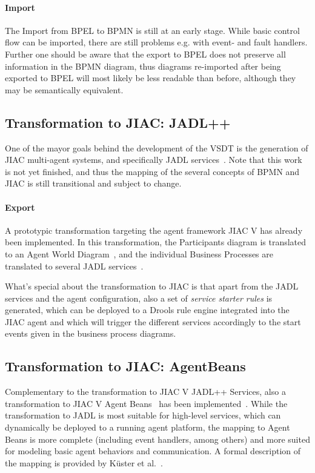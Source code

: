 \paragraph{Import}
The Import from BPEL to BPMN is still at an early stage.  While basic control
flow can be imported, there are still problems e.g. with event- and fault handlers.
Further one should be aware that the export to BPEL does not preserve all
information in the BPMN diagram, thus diagrams re-imported after being exported
to BPEL will most likely be less readable than before, although they may be
semantically equivalent.


\subsection{Transformation to JIAC: JADL++}
\label{sec:user_trafo_jadl}

One of the mayor goals behind the development of the VSDT is the generation of
JIAC multi-agent systems, and specifically JADL services~\cite{kuester2012integrating}.
Note that this work is not yet finished, and thus the mapping of the several
concepts of BPMN and JIAC is still transitional and subject to change.

\paragraph{Export}
A prototypic transformation targeting the agent framework JIAC V has already been
implemented.  In this transformation, the Participants diagram is translated to
an Agent World Diagram~\cite{lutzenberger2009unifying}, and the individual Business
Processes are translated to several JADL services~\cite{hirsch2010programming}.

What's special about the transformation to JIAC is that apart from the JADL
services and the agent configuration, also a set of \emph{service starter rules}
is generated, which can be deployed to a Drools rule engine integrated into the
JIAC agent and which will trigger the different services accordingly to the start
events given in the business process diagrams.


\subsection{Transformation to JIAC: AgentBeans}
\label{sec:user_trafo_agentbeans}

Complementary to the transformation to JIAC V JADL++ Services, also a transformation
to JIAC V Agent Beans~\cite{lutzenberger2013jiacShort} has been implemented~\cite{kuester2014agentbeans}.
While the transformation to JADL is most suitable for high-level services, which
can dynamically be deployed to a running agent platform, the mapping to Agent
Beans is more complete (including event handlers, among others) and more suited
for modeling basic agent behaviors and communication. A formal description of the
mapping is provided by K\"uster et al.~\cite{kuester2015formal}.

